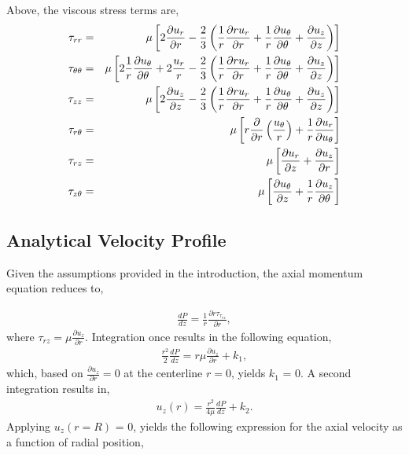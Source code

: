 \documentclass{article}
\begin{document}
%
Above, the viscous stress terms are,
%
\begin{eqnarray}
  \tau_{rr} & = & \mu \left[ 2 {{\partial u_r} \over {\partial r}} 
              - {2 \over 3} \left( \frac{1}{r} \frac{\partial r u_r}{\partial r}
              + \frac{1}{r} \frac{\partial u_\theta}{\partial \theta}
              + \frac{\partial u_z}{\partial z} \right ) \right]  \\
  \tau_{\theta\theta} & = & \mu \left[ 2\frac{1}{r} \frac{\partial u_\theta}{\partial \theta} + 2 {u_r \over r} 
              - {2 \over 3} \left( \frac{1}{r} \frac{\partial r u_r}{\partial r}
              + \frac{1}{r} \frac{\partial u_\theta}{\partial \theta}
              + \frac{\partial u_z}{\partial z} \right ) \right]  \\
  \tau_{zz} & = & \mu \left[ 2 {{\partial u_z} \over {\partial z}} 
              - {2 \over 3} \left( \frac{1}{r} \frac{\partial r u_r}{\partial r}
              + \frac{1}{r} \frac{\partial u_\theta}{\partial \theta}
              + \frac{\partial u_z}{\partial z} \right ) \right]  \\
  \tau_{r\theta}  & = & \mu \left[ r \frac{\partial} {\partial r} \left( \frac{u_\theta}{r} \right) 
                             + \frac{1}{r} \frac{\partial u_r}{\partial u_\theta} \right] \\
  \tau_{rz} & = & \mu \left[ {{\partial u_r} \over {\partial z}} 
                         +   {{\partial u_z} \over {\partial r}} \right]  \\
  \tau_{z\theta} & = & \mu  \left[ {{\partial u_\theta} \over {\partial z}} + \frac{1}{r}\frac{\partial u_z}{\partial \theta} \right]
\end{eqnarray}
%
\subsection{Analytical Velocity Profile}
Given the assumptions provided in the introduction, the axial momentum equation reduces to,

\begin{align}
  \frac{d P}{dz} = \frac{1}{r}\frac{\partial r \tau_{\tau_{r z}}}{\partial r},
\label{eq:simpEq}
\end{align}
where $\tau_{r z} = \mu \frac{\partial u_z}{\partial r}$.
Integration once results in the following equation,
\begin{align}
  \frac{r^2}{2} \frac{d P}{dz} = r \mu \frac{\partial u_z}{\partial r} + k_1,
\label{eq:intOnce}
\end{align}
which, based on $\frac{\partial u_z}{\partial r} = 0$ at the centerline $r=0$, yields
$k_1$ = 0. A second integration results in,
\begin{align}
  u_z(r) = \frac{r^2}{4 \mu}\frac{d P}{dz} + k_2.
\label{eq:simpEqWithK}
\end{align}
Applying $u_z(r=R)$ = 0, yields the following expression for the axial velocity as a 
function of radial position,
\end{document}
